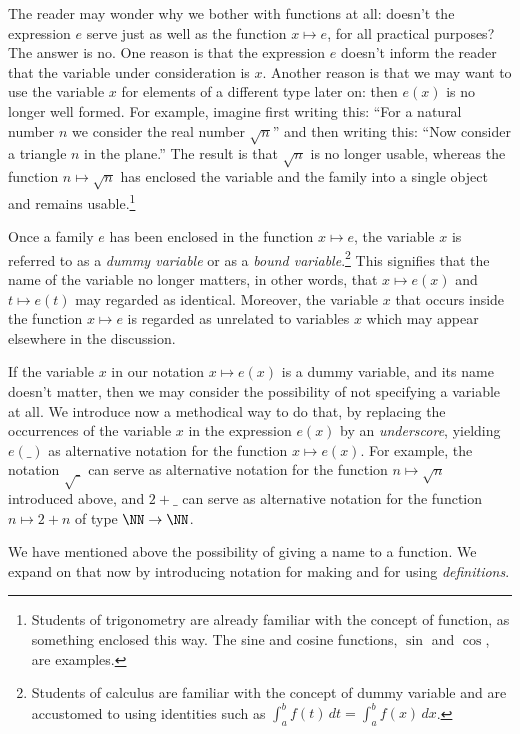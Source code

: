 The reader may wonder why we bother with functions at all: doesn't the expression $e$ serve just as well as the function $x \mapsto e$, for all
practical purposes?  The answer is no.  One reason is that the expression $e$ doesn't inform the reader that the variable under consideration is
$x$.  Another reason is that we may want to use the variable $x$ for elements of a different type later on: then $e(x)$ is no longer well
formed.  For example, imagine first writing this: ``For a natural number $n$ we consider the real number $\sqrt n$'' and then writing this:
``Now consider a triangle $n$ in the plane.''  The result is that $\sqrt n$ is no longer usable, whereas the function $n \mapsto \sqrt n$ has
enclosed the variable and the family into a single object and remains usable.\footnote{Students of trigonometry are already familiar with the
concept of function, as something enclosed this way.  The sine and cosine functions, $\sin$ and $\cos$, are examples.}

Once a family $e$ has been enclosed in the function $x \mapsto e$, the variable $x$ is referred to as a \emph{dummy variable} or as a \emph{bound variable}.\footnote{Students of calculus are familiar with the concept of dummy variable
and are accustomed to using identities such as $\int_a^b f(t)\,dt = \int_a^b f(x)\,dx$.} This signifies that the name of the variable no longer
matters, in other words, that $x \mapsto e(x)$ and $t \mapsto e(t)$ may regarded as identical.  Moreover, the variable $x$ that occurs inside
the function $x \mapsto e$ is regarded as unrelated to variables $x$ which may appear elsewhere in the discussion.

If the variable $x$ in our notation $x \mapsto e(x)$ is a dummy variable, and its name doesn't matter, then we may consider the possibility of
not specifying a variable at all.  We introduce now a methodical way to do that, by replacing the occurrences of the variable $x$ in the
expression $e(x)$ by an \emph{underscore}, yielding $e(\_)$ as alternative notation for the function $x \mapsto e(x)$.  For example, the
notation $\sqrt \_$ can serve as alternative notation for the function $n \mapsto \sqrt n$ introduced above, and $2 + \_$ can serve as
alternative notation for the function $n \mapsto 2 + n$ of type $\NN \to \NN$.

We have mentioned above the possibility of giving a name to a function.
We expand on that now by introducing notation for making and for using \emph{definitions}.

